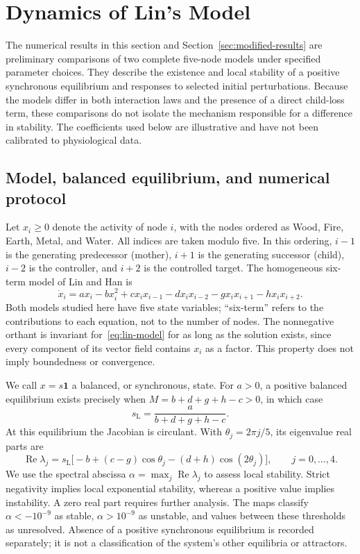 \section{Dynamics of Lin's Model}
\label{sec:lin-results}

The numerical results in this section and Section~\ref{sec:modified-results}
are preliminary comparisons of two complete five-node models under specified
parameter choices. They describe the existence and local stability of a
positive synchronous equilibrium and responses to selected initial
perturbations. Because the models differ in both interaction laws and the
presence of a direct child-loss term, these comparisons do not isolate the
mechanism responsible for a difference in stability. The coefficients used
below are illustrative and have not been calibrated to physiological data.

\subsection{Model, balanced equilibrium, and numerical protocol}
Let $x_i\geq0$ denote the activity of node $i$, with the nodes ordered as
Wood, Fire, Earth, Metal, and Water. All indices are taken modulo five.
In this ordering, $i-1$ is the generating predecessor (mother), $i+1$ is
the generating successor (child), $i-2$ is the controller, and $i+2$ is
the controlled target. The homogeneous six-term model of Lin and Han
\cite{Lin2020} is
\begin{equation}
\dot x_i=a x_i-bx_i^2+c x_i x_{i-1}-d x_i x_{i-2}
               -g x_i x_{i+1}-h x_i x_{i+2}.
\label{eq:lin-model}
\end{equation}
Both models studied here have five state variables; ``six-term'' refers to
the contributions to each equation, not to the number of nodes.
The nonnegative orthant is invariant for~\eqref{eq:lin-model} for as long
as the solution exists, since every component of its vector field contains
$x_i$ as a factor. This property does not imply boundedness or convergence.

We call $x=s\mathbf{1}$ a balanced, or synchronous, state. For $a>0$,
a positive balanced equilibrium exists precisely when
$M=b+d+g+h-c>0$, in which case
\begin{equation}
 s_{\mathrm L}=\frac{a}{b+d+g+h-c}.
 \label{eq:lin-balance}
\end{equation}
At this equilibrium the Jacobian is circulant. With
$\theta_j=2\pi j/5$, its eigenvalue real parts are
\begin{equation}
 \operatorname{Re}\lambda_j
 =s_{\mathrm L}\bigl[-b+(c-g)\cos\theta_j
                         -(d+h)\cos(2\theta_j)\bigr],
 \qquad j=0,\ldots,4.
 \label{eq:lin-spectrum}
\end{equation}
We use the spectral abscissa
$\alpha=\max_j\operatorname{Re}\lambda_j$ to assess local stability.
Strict negativity implies local exponential stability, whereas a positive
value implies instability. A zero real part requires further analysis.
The maps classify $\alpha<-10^{-9}$ as stable, $\alpha>10^{-9}$ as
unstable, and values between these thresholds as unresolved. Absence of a
positive synchronous equilibrium is recorded separately; it is not a
classification of the system's other equilibria or attractors.

